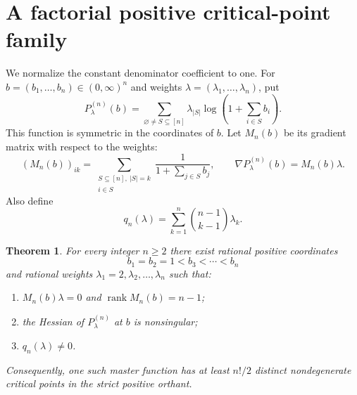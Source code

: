 \documentclass[11pt]{article}
\newtheorem{theorem}{Theorem}
\begin{document}
\section{A factorial positive critical-point family}

We normalize the constant denominator coefficient to one. For
$b=(b_1,\ldots,b_n)\in(0,\infty)^n$ and weights
$\lambda=(\lambda_1,\ldots,\lambda_n)$, put
\[
 P^{(n)}_\lambda(b)=
 \sum_{\varnothing\ne S\subseteq[n]}
       \lambda_{|S|}\log\left(1+\sum_{i\in S}b_i\right).
\]
This function is symmetric in the coordinates of $b$. Let $M_n(b)$ be its
gradient matrix with respect to the weights:
\[
 (M_n(b))_{ik}=
 \sum_{\substack{S\subseteq[n],\ |S|=k\\ i\in S}}
        \frac{1}{1+\sum_{j\in S}b_j},
 \qquad \nabla P^{(n)}_\lambda(b)=M_n(b)\lambda.
\]
Also define
\[
 q_n(\lambda)=\sum_{k=1}^n\binom{n-1}{k-1}\lambda_k.
\]

\begin{theorem}
For every integer $n\geq2$ there exist rational positive coordinates
\[
 b_1=b_2=1<b_3<\cdots<b_n
\]
and rational weights $\lambda_1=2,\lambda_2,\ldots,\lambda_n$ such that:
\begin{enumerate}
\item $M_n(b)\lambda=0$ and $\operatorname{rank}M_n(b)=n-1$;
\item the Hessian of $P^{(n)}_\lambda$ at $b$ is nonsingular;
\item $q_n(\lambda)\ne0$.
\end{enumerate}
Consequently, one such master function has at least $n!/2$ distinct
nondegenerate critical points in the strict positive orthant.
\end{theorem}
\end{document}
